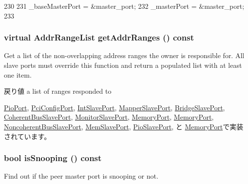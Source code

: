 \begin{DoxyCode}
230 {
231     _baseMasterPort = &master_port;
232     _masterPort = &master_port;
233 }
\end{DoxyCode}
\hypertarget{classSlavePort_a6e967f8921e80748eb2be35b6b481a7e}{
\subsubsection[{getAddrRanges}]{\setlength{\rightskip}{0pt plus 5cm}virtual {\bf AddrRangeList} getAddrRanges () const}}
\label{classSlavePort_a6e967f8921e80748eb2be35b6b481a7e}
Get a list of the non-\/overlapping address ranges the owner is responsible for. All slave ports must override this function and return a populated list with at least one item.

\begin{DoxyReturn}{戻り値}
a list of ranges responded to 
\end{DoxyReturn}


\hyperlink{classPioPort_a36cf113d5e5e091ebddb32306c098fae}{PioPort}, \hyperlink{classPciDevice_1_1PciConfigPort_a36cf113d5e5e091ebddb32306c098fae}{PciConfigPort}, \hyperlink{classX86ISA_1_1IntDevice_1_1IntSlavePort_a36cf113d5e5e091ebddb32306c098fae}{IntSlavePort}, \hyperlink{classAddrMapper_1_1MapperSlavePort_a36cf113d5e5e091ebddb32306c098fae}{MapperSlavePort}, \hyperlink{classBridge_1_1BridgeSlavePort_a36cf113d5e5e091ebddb32306c098fae}{BridgeSlavePort}, \hyperlink{classCoherentBus_1_1CoherentBusSlavePort_a9367d737cb872cb8573f44b501f99363}{CoherentBusSlavePort}, \hyperlink{classCommMonitor_1_1MonitorSlavePort_a36cf113d5e5e091ebddb32306c098fae}{MonitorSlavePort}, \hyperlink{classDRAMCtrl_1_1MemoryPort_a36cf113d5e5e091ebddb32306c098fae}{MemoryPort}, \hyperlink{classDRAMSim2_1_1MemoryPort_a36cf113d5e5e091ebddb32306c098fae}{MemoryPort}, \hyperlink{classNoncoherentBus_1_1NoncoherentBusSlavePort_a9367d737cb872cb8573f44b501f99363}{NoncoherentBusSlavePort}, \hyperlink{classRubyPort_1_1MemSlavePort_a36cf113d5e5e091ebddb32306c098fae}{MemSlavePort}, \hyperlink{classRubyPort_1_1PioSlavePort_a36cf113d5e5e091ebddb32306c098fae}{PioSlavePort}, と \hyperlink{classSimpleMemory_1_1MemoryPort_a36cf113d5e5e091ebddb32306c098fae}{MemoryPort}で実装されています。\hypertarget{classSlavePort_a5ce11b7a254d3cb756d94568f7cbc25d}{
\subsubsection[{isSnooping}]{\setlength{\rightskip}{0pt plus 5cm}bool isSnooping () const}}
\label{classSlavePort_a5ce11b7a254d3cb756d94568f7cbc25d}
Find out if the peer master port is snooping or not.

